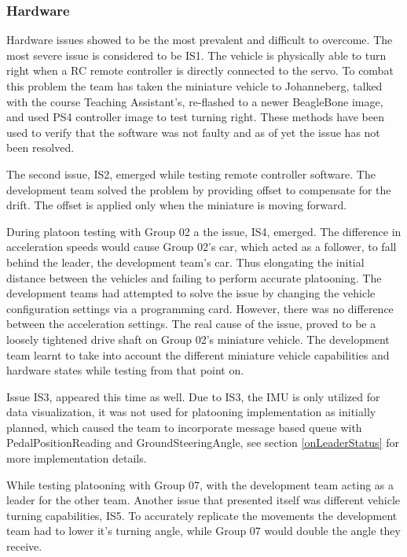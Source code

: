 \documentclass[12pt]{article}
\begin{document}
\subsubsection{Hardware}\label{hardware issues}
Hardware issues showed to be the most prevalent and difficult to overcome. The most severe issue is considered to be IS1. The vehicle is physically able to turn right when a RC remote controller is directly connected to the servo. To combat this problem the team has taken the miniature vehicle to Johanneberg, talked with the course Teaching Assistant's, re-flashed to a newer BeagleBone image, and used PS4 controller image\cite{PS4 controller} to test turning right. These methods have been used to verify that the software was not faulty and as of yet the issue has not been resolved. \par
The second issue, IS2, emerged while testing remote controller software. The development team solved the problem by providing offset to compensate for the drift. The offset is applied only when the miniature is moving forward. \par
During platoon testing with Group 02 a the issue, IS4, emerged. The difference in acceleration speeds would cause Group 02's car, which acted as a follower, to fall behind the leader, the development team's car. Thus elongating the initial distance between the vehicles and failing to perform accurate platooning. The development teams had attempted to solve the issue by changing the vehicle configuration settings via a programming card. However, there was no difference between the acceleration settings. The real cause of the issue, proved to be a loosely tightened drive shaft on Group 02's miniature vehicle. The development team learnt to take into account the different miniature vehicle capabilities and hardware states while testing from that point on. \par
Issue IS3, appeared this time as well. Due to IS3, the IMU is only utilized for data visualization, it was not used for platooning implementation as initially planned, which caused the team to incorporate message based queue with PedalPositionReading and GroundSteeringAngle, see section \ref{onLeaderStatus} for more implementation details.  

While testing platooning with Group 07, with the development team acting as a leader for the other team. Another issue that presented itself was different vehicle turning capabilities, IS5. To accurately replicate the movements the development team had to lower it's turning angle, while Group 07 would double the angle they receive.
\end{document}
